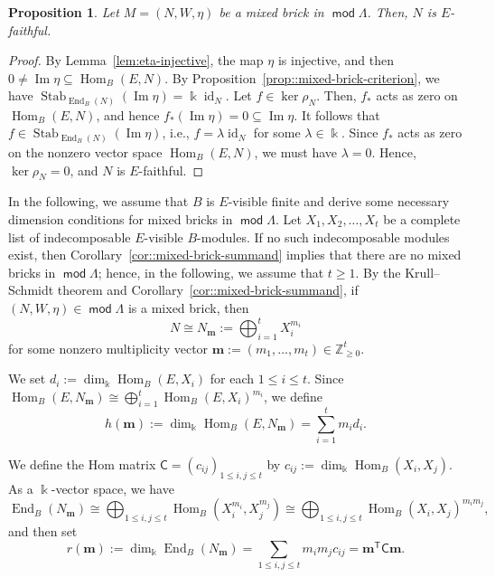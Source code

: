 \documentclass[a4,12pt]{amsart}
\numberwithin{equation}{section} %
\def\Hom{\operatorname{Hom}} %
\def\End{\operatorname{End}} %
\def\Im{\operatorname{Im}} %
\def\Stab{\operatorname{Stab}} %
\def\mod{\operatorname{\mathsf{mod}}}
\newtheorem{proposition}[theorem]{Proposition} %
\theoremstyle{definition} %
\begin{document}
\begin{proposition}
Let $M=(N,W,\eta)$ be a mixed brick in $\mod \Lambda$. Then, $N$ is $E$-faithful. 
\end{proposition}
\begin{proof}
By Lemma~\ref{lem:eta-injective}, the map $\eta$ is injective, and then $0\neq \Im\eta\subseteq \Hom_B(E,N)$. By Proposition~\ref{prop::mixed-brick-criterion}, we have $\Stab_{\End_B(N)}(\Im\eta)=\Bbbk\operatorname{id}_{N}$. Let $f\in\ker\rho_N$. Then, $f_*$ acts as zero on $\Hom_B(E,N)$, and hence $f_*(\Im\eta)=0\subseteq \Im\eta$. It follows that $f\in\Stab_{\End_B(N)}(\Im\eta)$, i.e., $f=\lambda\operatorname{id}_{N}$ for some $\lambda\in\Bbbk$. Since $f_*$ acts as zero on the nonzero vector space $\Hom_B(E,N)$, we must have $\lambda=0$. Hence, $\ker\rho_N=0$, and $N$ is $E$-faithful.
\end{proof}

In the following, we assume that $B$ is $E$-visible finite and derive some necessary dimension conditions for mixed bricks in $\mod \Lambda$. Let $X_1,X_2,\ldots,X_t$ be a complete list of indecomposable $E$-visible $B$-modules. If no such indecomposable modules exist, then Corollary~\ref{cor::mixed-brick-summand} implies that there are no mixed bricks in $\mod \Lambda$; hence, in the following, we assume that $t\geq1$. By the Krull--Schmidt theorem and Corollary~\ref{cor::mixed-brick-summand}, if $(N,W,\eta)\in \mod \Lambda$ is a mixed brick, then
\[
N\cong N_{\mathbf{m}}:= \bigoplus_{i=1}^t X_i^{m_i}
\]
for some nonzero multiplicity vector $\mathbf{m}:=(m_1,\ldots,m_t)\in\mathbb{Z}_{\geq 0}^t$. 

We set $d_i:=\dim_{\Bbbk}\Hom_B(E,X_i)$ for each $1\leq i\leq t$. Since $\Hom_B(E,N_{\mathbf{m}}) \cong \bigoplus_{i=1}^t \Hom_B(E,X_i)^{m_i}$, we define
\[
h(\mathbf{m})
:=
\dim_{\Bbbk}\Hom_B(E,N_{\mathbf{m}})
=
\sum_{i=1}^t m_i d_i .
\] 

We define the Hom matrix $\mathsf{C}=(c_{ij})_{1\leq i,j\leq t}$ by $c_{ij}:=\dim_{\Bbbk}\Hom_B(X_i,X_j)$. As a $\Bbbk$-vector space, we have 
\[
\End_B(N_{\mathbf{m}})
\cong
\bigoplus_{1\leq i,j\leq t}
\Hom_B(X_i^{m_i},X_j^{m_j})\cong
\bigoplus_{1\leq i,j\leq t}
\Hom_B(X_i,X_j)^{m_im_j},  
\]
and then set
\[
r(\mathbf{m}) := \dim_{\Bbbk}\End_B(N_{\mathbf{m}})
= \sum_{1\leq i,j\leq t} m_i m_j c_{ij}
= \mathbf{m}^{\mathsf{T}}\mathsf{C}\mathbf{m}.
\]
\end{document}
